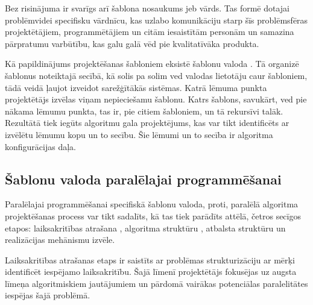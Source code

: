 Bez risinājuma ir svarīgs arī šablona nosaukums jeb vārds. Tas formē dotajai
problēmvidei specifisku vārdnīcu, kas uzlabo komunikāciju starp šīs problēmsfēras
projektētājiem, programmētājiem un citām iesaistītām personām un samazina
pārpratumu varbūtību, kas galu galā vēd pie kvalitatīvāka produkta.

Kā papildinājums projektēšanas šabloniem eksistē šablonu valoda .
Tā organizē šablonus noteiktajā secībā, kā solis pa solim ved valodas lietotāju
caur šabloniem, tādā veidā ļaujot izveidot sarežģītākās sistēmas. Katrā lēmuma
punkta projektētājs izvēlas viņam nepieciešamu šablonu. Katrs šablons, savukārt, ved pie
nākama lēmumu punkta, tas ir, pie citiem šabloniem, un tā rekursīvi talāk.
Rezultātā tiek iegūts algoritmu gala projektējums, kas var tikt identificēts ar
izvēlētu lēmumu kopu un to secību. Šie lēmumi un to secība ir algoritma konfigurācijas
daļa.

\subsection{Šablonu valoda paralēlajai programmēšanai}
Paralēlajai programmēšanai specifiskā šablonu valoda, proti, paralēlā algoritma
projektēšanas process var tikt sadalīts, kā tas tiek parādīts 
attēlā, četros secīgos etapos: laiksakritības
atrašana , algoritma struktūru , atbalsta struktūru  un realizācijas
mehānismu  izvēle.


Laiksakritības atrašanas etaps ir saistīts ar problēmas strukturizāciju ar mērķi identificēt
iespējamo laiksakritību. Šajā līmenī projektētājs fokusējas uz augsta līmeņa algoritmiskiem
jautājumiem un pārdomā vairākas potenciālas paralelitātes iespējas šajā problēmā.



